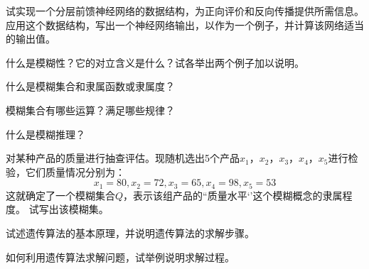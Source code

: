 \begin{question}
试实现一个分层前馈神经网络的数据结构，为正向评价和反向传播提供所需信息。应用这个数据结构，写出一个神经网络输出，以作为一个例子，并计算该网络适当的输出值。
\end{question}
\begin{solution}
\end{solution}

\begin{question}
什么是模糊性？它的对立含义是什么？试各举出两个例子加以说明。
\end{question}
\begin{solution}
\end{solution}

\begin{question}
什么是模糊集合和隶属函数或隶属度？
\end{question}
\begin{solution}
\end{solution}

\begin{question}
模糊集合有哪些运算？满足哪些规律？
\end{question}
\begin{solution}
\end{solution}

\begin{question}
什么是模糊推理？
\end{question}
\begin{solution}
\end{solution}

\begin{question}
对某种产品的质量进行抽查评估。现随机选出5个产品$x_1$，$x_2$，$x_3$，$x_4$，$x_5$进行检验，它们质量情况分别为：
\[ x_1=80, x_2=72, x_3=65, x_4=98, x_5=53\]
这就确定了一个模糊集合$Q$，表示该组产品的``质量水平‘’这个模糊概念的隶属程度。
试写出该模糊集。
\end{question}
\begin{solution}
\end{solution}

\begin{question}
试述遗传算法的基本原理，并说明遗传算法的求解步骤。
\end{question}
\begin{solution}
\end{solution}

\begin{question}
如何利用遗传算法求解问题，试举例说明求解过程。
\end{question}
\begin{solution}
\end{solution}


